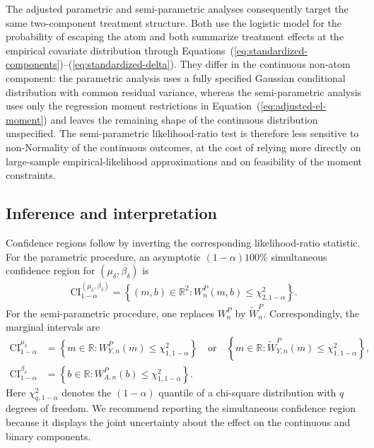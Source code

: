 \documentclass[11pt]{article}
\begin{document}
The adjusted parametric and semi-parametric analyses consequently target the same two-component treatment structure. Both use the logistic model for the probability of escaping the atom and both summarize treatment effects at the empirical covariate distribution through Equations~(\ref{eq:standardized-components})--(\ref{eq:standardized-delta}). They differ in the continuous non-atom component: the parametric analysis uses a fully specified Gaussian conditional distribution with common residual variance, whereas the semi-parametric analysis uses only the regression moment restrictions in Equation~(\ref{eq:adjusted-el-moment}) and leaves the remaining shape of the continuous distribution unspecified. The semi-parametric likelihood-ratio test is therefore less sensitive to non-Normality of the continuous outcomes, at the cost of relying more directly on large-sample empirical-likelihood approximations and on feasibility of the moment constraints.

\subsection{Inference and interpretation}

Confidence regions follow by inverting the corresponding likelihood-ratio statistic. For the parametric procedure, an asymptotic $(1-\alpha)100\%$ simultaneous confidence region for $(\mu_\delta,\beta_\delta)$ is
\begin{align*}
  \mathrm{CI}^{(\mu_\delta,\beta_\delta)}_{1-\alpha}
  = \left\{(m,b) \in \mathbb{R}^2 : W_n^P(m,b) \leq \chi^2_{2,1-\alpha}\right\}.
\end{align*}
For the semi-parametric procedure, one replaces $W_n^P$ by $\widetilde{W}_n^P$. Correspondingly, the marginal intervals are
\begin{align*}
  \mathrm{CI}^{\mu_\delta}_{1-\alpha}
  &= \left\{m \in \mathbb{R} : W_{Y,n}^P(m) \leq \chi^2_{1,1-\alpha}\right\}
  \quad \text{or} \quad
  \left\{m \in \mathbb{R} : \widetilde{W}_{Y,n}^P(m) \leq \chi^2_{1,1-\alpha}\right\},\\
  \mathrm{CI}^{\beta_\delta}_{1-\alpha}
  &= \left\{b \in \mathbb{R} : W_{A,n}^P(b) \leq \chi^2_{1,1-\alpha}\right\}.
\end{align*}
Here $\chi^2_{q,1-\alpha}$ denotes the $(1-\alpha)$ quantile of a chi-square distribution with $q$ degrees of freedom. We recommend reporting the simultaneous confidence region because it displays the joint uncertainty about the effect on the continuous and binary components.
\end{document}
